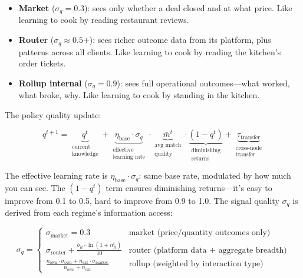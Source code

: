 \documentclass[12pt]{article}
\theoremstyle{definition}
\begin{document}
\begin{itemize}[leftmargin=*]
\item \textbf{Market} ($\sigma_q = 0.3$): sees only whether a deal closed and at what price. Like learning to cook by reading restaurant reviews.
\item \textbf{Router} ($\sigma_q \approx 0.5\text{+}$): sees richer outcome data from its platform, plus patterns across all clients. Like learning to cook by reading the kitchen's order tickets.
\item \textbf{Rollup internal} ($\sigma_q = 0.9$): sees full operational outcomes---what worked, what broke, why. Like learning to cook by standing in the kitchen.
\end{itemize}

\noindent The policy quality update:

\begin{equation}
\label{eq:learning}
q^{t+1} = \underbrace{q^t}_{\substack{\text{current} \\ \text{knowledge}}} + \underbrace{\eta_{\text{base}} \cdot \sigma_q}_{\substack{\text{effective} \\ \text{learning rate}}} \cdot \underbrace{\bar{m}^t}_{\substack{\text{avg match} \\ \text{quality}}} \cdot \underbrace{(1 - q^t)}_{\substack{\text{diminishing} \\ \text{returns}}} + \underbrace{\tau_{\text{transfer}}}_{\substack{\text{cross-node} \\ \text{transfer}}}
\end{equation}

\noindent The effective learning rate is $\eta_{\text{base}} \cdot \sigma_q$: same base rate, modulated by how much you can see. The $(1 - q^t)$ term ensures diminishing returns---it's easy to improve from 0.1 to 0.5, hard to improve from 0.9 to 1.0. The signal quality $\sigma_q$ is derived from each regime's information access:

\begin{equation}
\sigma_q = \begin{cases}
\sigma_{\text{market}} = 0.3 & \text{market (price/quantity outcomes only)} \\[4pt]
\sigma_{\text{router}} + \frac{b_R \cdot \ln(1 + n_R^t)}{10} & \text{router (platform data + aggregate breadth)} \\[4pt]
\frac{n_{\text{own}} \cdot \sigma_{\text{own}} + n_{\text{ext}} \cdot \sigma_{\text{market}}}{n_{\text{own}} + n_{\text{ext}}} & \text{rollup (weighted by interaction type)}
\end{cases}
\end{equation}
\end{document}
